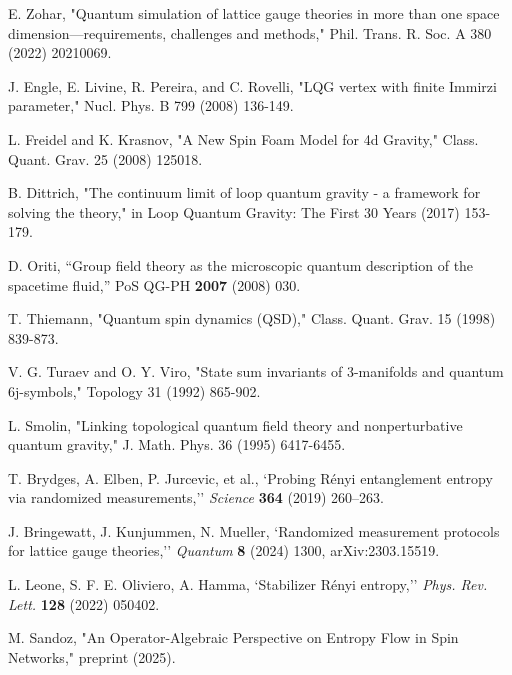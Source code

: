 \documentclass[11pt, a4paper]{article}
\theoremstyle{plain}
\theoremstyle{definition}
\theoremstyle{remark}
\begin{document}
\begin{thebibliography}{99}
   E. Zohar, "Quantum simulation of lattice gauge theories in more than one space dimension—requirements, challenges and methods," Phil. Trans. R. Soc. A 380 (2022) 20210069.

   J. Engle, E. Livine, R. Pereira, and C. Rovelli, "LQG vertex with finite Immirzi parameter," Nucl. Phys. B 799 (2008) 136-149.

   L. Freidel and K. Krasnov, "A New Spin Foam Model for 4d Gravity," Class. Quant. Grav. 25 (2008) 125018.

   B. Dittrich, "The continuum limit of loop quantum gravity - a framework for solving the theory," in Loop Quantum Gravity: The First 30 Years (2017) 153-179.

   D. Oriti, ``Group field theory as the microscopic quantum description of the spacetime fluid,'' PoS QG-PH \textbf{2007} (2008) 030.

   T. Thiemann, "Quantum spin dynamics (QSD)," Class. Quant. Grav. 15 (1998) 839-873.

   V. G. Turaev and O. Y. Viro, "State sum invariants of 3-manifolds and quantum 6j-symbols," Topology 31 (1992) 865-902.

   L. Smolin, "Linking topological quantum field theory and nonperturbative quantum gravity," J. Math. Phys. 36 (1995) 6417-6455.

   T. Brydges, A. Elben, P. Jurcevic, et al., `Probing R\'enyi entanglement entropy via randomized measurements,'' \textit{Science} \textbf{364} (2019) 260--263.

   J. Bringewatt, J. Kunjummen, N. Mueller, `Randomized measurement protocols for lattice gauge theories,'' \textit{Quantum} \textbf{8} (2024) 1300, arXiv:2303.15519.

   L. Leone, S. F. E. Oliviero, A. Hamma, `Stabilizer R\'enyi entropy,'' \textit{Phys. Rev. Lett.} \textbf{128} (2022) 050402.

   M. Sandoz, "An Operator-Algebraic Perspective on Entropy Flow in Spin Networks," preprint (2025).

\end{thebibliography}
\end{document}
